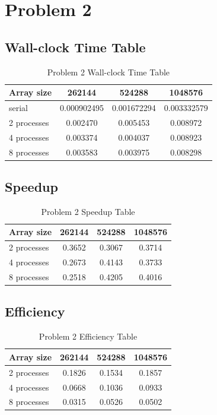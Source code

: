 \documentclass[11pt]{article}
\begin{document}
\section{Problem 2}
\label{sec:orgd5b4dd0}
\subsection{Wall-clock Time Table}
\label{sec:orgb07f4fd}

\begin{table}[htbp]
\caption{Problem 2 Wall-clock Time Table}
\centering
\begin{tabular}{|l|c|c|c|}
\hline
Array size & 262144 & 524288 & 1048576\\
\hline
serial & 0.000902495 & 0.001672294 & 0.003332579\\
\hline
2 processes & 0.002470 & 0.005453 & 0.008972\\
\hline
4 processes & 0.003374 & 0.004037 & 0.008923\\
\hline
8 processes & 0.003583 & 0.003975 & 0.008298\\
\hline
\end{tabular}
\end{table}
\subsection{Speedup}
\label{sec:orgd56ea16}

\begin{table}[htbp]
\caption{Problem 2 Speedup Table}
\centering
\begin{tabular}{|l|c|c|c|}
\hline
Array size & 262144 & 524288 & 1048576\\
\hline
2 processes & 0.3652 & 0.3067 & 0.3714\\
\hline
4 processes & 0.2673 & 0.4143 & 0.3733\\
\hline
8 processes & 0.2518 & 0.4205 & 0.4016\\
\hline
\end{tabular}
\end{table}
\subsection{Efficiency}
\label{sec:orgb14973e}

\begin{table}[htbp]
\caption{Problem 2 Efficiency Table}
\centering
\begin{tabular}{|l|c|c|c|}
\hline
Array size & 262144 & 524288 & 1048576\\
\hline
2 processes & 0.1826 & 0.1534 & 0.1857\\
\hline
4 processes & 0.0668 & 0.1036 & 0.0933\\
\hline
8 processes & 0.0315 & 0.0526 & 0.0502\\
\hline
\end{tabular}
\end{table}
\end{document}
